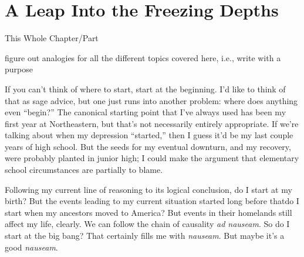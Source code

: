 \documentclass[./butidigress.tex]{subfiles}
\begin{document}
\chapter{A Leap Into the Freezing Depths}\label{chap:aleap}
\newpage

\begin{somenotes}{This Whole Chapter/Part}
    \item figure out analogies for all the different topics covered here, i.e., write with a purpose
\end{somenotes}

If you can't think of where to start, start at the beginning.
I'd like to think of that as sage advice, but one just runs into another problem: where does anything even \enquote{begin?}
The canonical starting point that I've always used has been my first year at Northeastern, but that's not necessarily entirely appropriate.
If we're talking about when my depression \enquote{started,} then I guess it'd be my last couple years of high school.
But the seeds for my eventual downturn, and my recovery, were probably planted in junior high; I could make the argument that elementary school circumstances are partially to blame.

Following my current line of reasoning to its logical conclusion, do I start at my birth?
But the events leading to my current situation started long before that\lips do I start when my ancestors moved to America?
But events in their homelands still affect my life, clearly.
We can follow the chain of causality \textit{ad nauseam}.
So do I start at the big bang?
That certainly fills me with \textit{nauseam}.
But maybe it's a good \textit{nauseam}.
\end{document}
